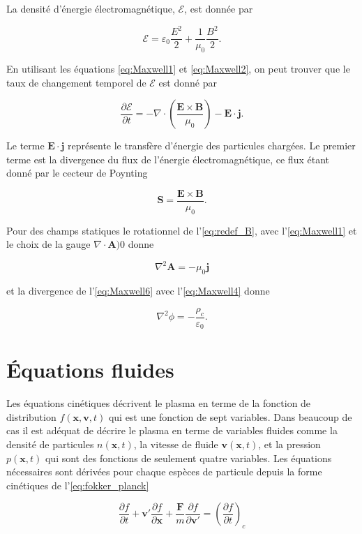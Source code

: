 \documentclass[main.tex]{subfiles}
\begin{document}
La densité d'énergie électromagnétique, \( \mathcal{E} \), est donnée par

\[
	\mathcal{E} = \varepsilon_0 \frac{E^2}{2} + \frac{1}{\mu_0} \frac{B^2}{2}.
\]

\noindent En utilisant les équations \ref{eq:Maxwell1} et \ref{eq:Maxwell2}, on peut trouver que le taux de changement temporel de \( \mathcal{E} \) est donné par

\[
	\frac{\partial \mathcal{E}}{\partial t} = - \nabla \cdot \left( \frac{\bm{E} \times \bm{B}}{\mu_0} \right) - \bm{E} \cdot \bm{j}.
\]

\noindent Le terme \( \bm{E} \cdot \bm{j} \) représente le transfère d'énergie des particules chargées.
Le premier terme est la divergence du flux de l'énergie électromagnétique, ce flux étant donné par le cecteur de Poynting

\[
	\bm{S} = \frac{\bm{E} \times \bm{B}}{\mu_0}.
\]

Pour des champs statiques le rotationnel de l'\autoref{eq:redef_B}, avec l'\autoref{eq:Maxwell1} et le choix de la gauge \( \nabla \cdot \bm{A} ) 0 \) donne

\[
	\nabla^2 \bm{A} = - \mu_0 \bm{j}
\]

\noindent et la divergence de l'\autoref{eq:Maxwell6} avec l'\autoref{eq:Maxwell4} donne

\[
	\nabla^2 \phi = - \frac{\rho_c}{\varepsilon_0}.
\]

\section{Équations fluides}
\label{sec:equations_fluides}

Les équations cinétiques décrivent le plasma en terme de la fonction de distribution \( f \left( \bm{x}, \bm{v}, t \right) \) qui est une fonction de sept variables.
Dans beaucoup de cas il est adéquat de décrire le plasma en terme de variables fluides comme la densité de particules \( n\left(\bm{x}, t \right) \), la vitesse de fluide \( \bm{v} \left(\bm{x}, t \right) \), et la pression \( p \left(\bm{x}, t \right) \) qui sont des fonctions de seulement quatre variables.
Les équations nécessaires sont dérivées pour chaque espèces de particule depuis la forme cinétiques de l'\autoref{eq:fokker_planck}

\begin{equation}
	\frac{\partial f}{\partial t} + \bm{v}' \frac{\partial f}{\partial \bm{x}} + \frac{\bm{F}}{m} \frac{\partial f}{\partial \bm{v}'} = \left( \frac{\partial f}{\partial t} \right)_c
	\label{eq:rappel_cinetique}
\end{equation}
\end{document}

